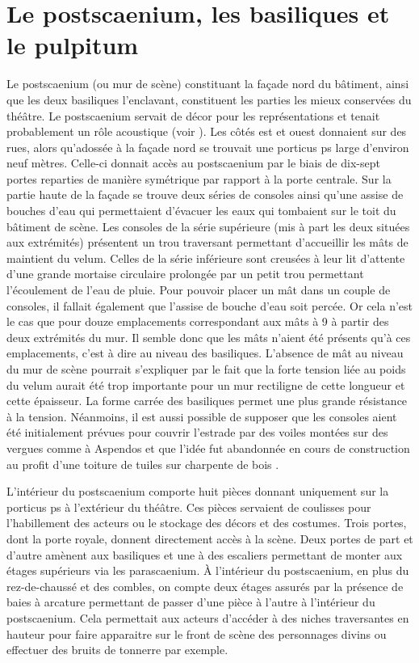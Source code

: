 \section{Le \gls{postscaenium}, les \glspl{basilique} et le \gls{pulpitum}}
\label{sect_postscaenium}
		
		Le \gls{postscaenium} (ou mur de scène) constituant la façade nord du bâtiment, ainsi que les deux \glspl{basilique} l'enclavant, constituent les parties les mieux conservées du théâtre. Le \gls{postscaenium} servait de décor pour les représentations et tenait probablement un rôle acoustique (voir ). Les côtés est et ouest donnaient sur des rues, alors qu'adossée à la façade nord se trouvait une \gls{porticus ps} large d'environ neuf mètres. Celle-ci donnait accès au \gls{postscaenium} par le biais de dix-sept portes reparties de manière symétrique par rapport à la porte centrale. Sur la partie haute de la façade se trouve deux séries de \glspl{console} ainsi qu'une assise de bouches d'eau qui permettaient d'évacuer les eaux qui tombaient sur le toit du bâtiment de scène. Les \glspl{console} de la série supérieure (mis à part les deux situées aux extrémités) présentent un trou traversant permettant d'accueillir les mâts de maintient du \gls{velum}. Celles de la série inférieure sont creusées à leur lit d'attente d'une grande mortaise circulaire prolongée par un petit trou permettant l'écoulement de l'eau de pluie. Pour pouvoir placer un mât dans un couple de \glspl{console}, il fallait également que l'assise de bouche d'eau soit percée. Or cela n'est le cas que pour douze emplacements correspondant aux mâts  à 9 à partir des deux extrémités du mur. Il semble donc que les mâts n'aient été présents qu'à ces emplacements, c'est à dire au niveau des \glspl{basilique}. L'absence de mât au niveau du mur de scène pourrait s'expliquer par le fait que la forte tension liée au poids du \gls{velum} aurait été trop importante pour un mur rectiligne de cette longueur et cette épaisseur. La forme carrée des basiliques permet une plus grande résistance à la tension. Néanmoins, il est aussi possible de supposer que les \glspl{console} aient été initialement prévues pour couvrir l'estrade par des voiles montées sur des vergues comme à Aspendos et que l'idée fut abandonnée en cours de construction au profit d'une toiture de tuiles sur charpente de bois \cite{moretti}. 
		
		L'intérieur du \gls{postscaenium} comporte huit pièces donnant uniquement sur la \gls{porticus ps} à l'extérieur du théâtre. Ces pièces servaient de coulisses pour l'habillement des acteurs ou le stockage des décors et des costumes. Trois portes, dont la porte royale, donnent directement accès à la scène. Deux portes de part et d'autre amènent aux \glspl{basilique} et une à des escaliers permettant de monter aux étages supérieurs via les \gls{parascaenium}. \`{A} l'intérieur du \gls{postscaenium}, en plus du rez-de-chaussé et des combles, on compte deux étages assurés par la présence de baies à arcature permettant de passer d'une pièce à l'autre à l'intérieur du \gls{postscaenium}. Cela permettait aux acteurs d'accéder à des niches traversantes en hauteur pour faire apparaitre sur le front de scène des personnages divins ou effectuer des bruits de tonnerre par exemple.
		
